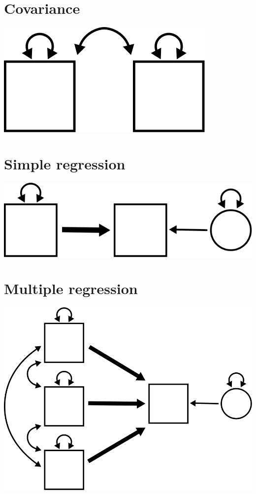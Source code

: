 \documentclass[
]{book}
\begin{document}
\hypertarget{covariance}{%
\chapter{Covariance}\label{covariance}}

\begin{center}\includegraphics{graphics/covariance} \end{center}

\hypertarget{simple}{%
\chapter{Simple regression}\label{simple}}

\begin{center}\includegraphics{graphics/simple_regression} \end{center}

\hypertarget{multiple}{%
\chapter{Multiple regression}\label{multiple}}

\begin{center}\includegraphics{graphics/multiple_regression} \end{center}
\end{document}
